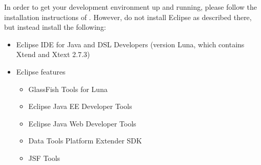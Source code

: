 
In order to get your development environment up and running, please follow the installation instructions of  . However, do not install Eclipse as described there, but instead install the following:

\begin{itemize}
\item Eclipse IDE for Java and DSL Developers (\eg version Luna, which contains Xtend and Xtext 2.7.3)
\item Eclipse features
\begin{itemize}
	\item GlassFish Tools for Luna
	\item Eclipse Java EE Developer Tools
	\item Eclipse Java Web Developer Tools
	\item Data Tools Platform Extender SDK
	\item JSF Tools
\end{itemize}
\end{itemize}
